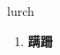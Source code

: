 
\begin{frame}
{\huge lurch}
\begin{center}
\begin{enumerate}\Large
  \item \textbf{蹒跚}
\end{enumerate}
\end{center}
\end{frame}
